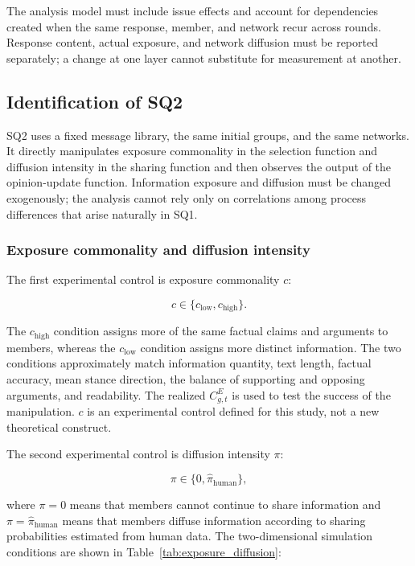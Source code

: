 \documentclass[11pt,a4paper]{article}
\begin{document}
The analysis model must include issue effects and account for dependencies created when the same response, member, and network recur across rounds. Response content, actual exposure, and network diffusion must be reported separately; a change at one layer cannot substitute for measurement at another.

\subsection{Identification of SQ2}

SQ2 uses a fixed message library, the same initial groups, and the same networks. It directly manipulates exposure commonality in the selection function and diffusion intensity in the sharing function and then observes the output of the opinion-update function. Information exposure and diffusion must be changed exogenously; the analysis cannot rely only on correlations among process differences that arise naturally in SQ1.

\subsubsection{Exposure commonality and diffusion intensity}

The first experimental control is exposure commonality $c$:

\begin{equation*}
c\in\{c_{\text{low}},c_{\text{high}}\}.
\end{equation*}

The $c_{\text{high}}$ condition assigns more of the same factual claims and arguments to members, whereas the $c_{\text{low}}$ condition assigns more distinct information. The two conditions approximately match information quantity, text length, factual accuracy, mean stance direction, the balance of supporting and opposing arguments, and readability. The realized $C^{E}_{g,t}$ is used to test the success of the manipulation. $c$ is an experimental control defined for this study, not a new theoretical construct.

The second experimental control is diffusion intensity $\pi$:

\begin{equation*}
\pi\in\{0,\hat\pi_{\text{human}}\},
\end{equation*}

where $\pi=0$ means that members cannot continue to share information and $\pi=\hat\pi_{\text{human}}$ means that members diffuse information according to sharing probabilities estimated from human data. The two-dimensional simulation conditions are shown in Table~\ref{tab:exposure_diffusion}:
\end{document}
